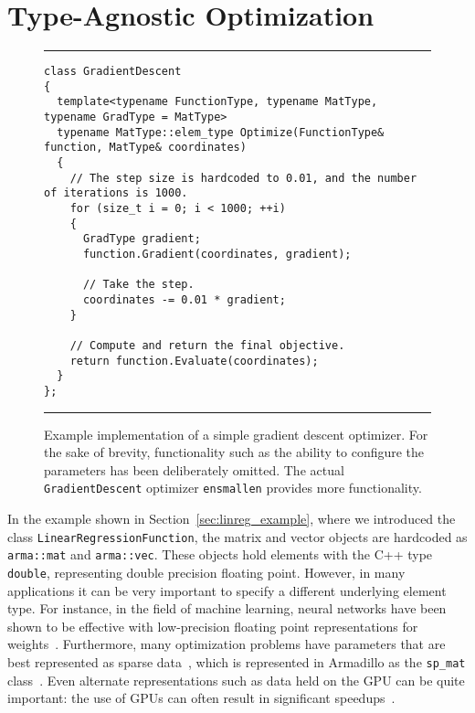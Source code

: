 \section{Type-Agnostic Optimization}
\label{sec:templated_optimize}


\begin{figure}[b!]
\hrule
\vspace{1ex}
\begin{verbatim}
class GradientDescent
{
  template<typename FunctionType, typename MatType, typename GradType = MatType>
  typename MatType::elem_type Optimize(FunctionType& function, MatType& coordinates)
  {
    // The step size is hardcoded to 0.01, and the number of iterations is 1000.
    for (size_t i = 0; i < 1000; ++i)
    {
      GradType gradient;
      function.Gradient(coordinates, gradient);

      // Take the step.
      coordinates -= 0.01 * gradient;
    }

    // Compute and return the final objective.
    return function.Evaluate(coordinates);
  }
};
\end{verbatim}
\hrule
\vspace*{-0.5em}
\caption{Example implementation of a simple gradient descent optimizer.
For the sake of brevity, functionality such as the ability to configure the parameters has
been deliberately omitted.
The actual {\tt GradientDescent} optimizer {\tt ensmallen} provides more functionality.
}

\label{fig:gd}
\end{figure}

In the example shown in Section~\ref{sec:linreg_example},
where we introduced the class {\tt LinearRegressionFunction},
the matrix and vector objects are hardcoded as {\tt arma::mat} and {\tt arma::vec}.
These objects hold elements with the C++ type {\tt double},
representing double precision floating point.
However, in many applications it can be very important to specify a different
underlying element type.  For instance, in the field of machine learning, neural
networks have been shown to be effective with low-precision floating point
representations for weights~\cite{vanhoucke2011improving}.
Furthermore, many optimization problems have parameters
that are best represented as sparse data~\cite{van2011sparse, recht2011hogwild},
which is represented in Armadillo as the {\tt sp\_mat} class~\cite{sanderson2018user, mca24030070}.
Even alternate representations such as data held on the GPU can be quite
important: the use of GPUs can often result in significant
speedups~\cite{oh2004gpu, athanasopoulos2011gpu}.

